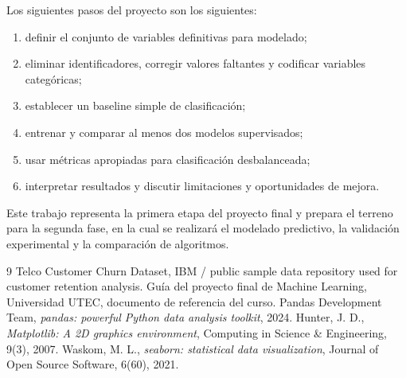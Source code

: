\documentclass[conference]{IEEEtran}
\begin{document}
Los siguientes pasos del proyecto son los siguientes:
\begin{enumerate}[leftmargin=*]
 \item definir el conjunto de variables definitivas para modelado;
 \item eliminar identificadores, corregir valores faltantes y codificar variables categóricas;
 \item establecer un baseline simple de clasificación;
 \item entrenar y comparar al menos dos modelos supervisados;
 \item usar métricas apropiadas para clasificación desbalanceada;
 \item interpretar resultados y discutir limitaciones y oportunidades de mejora.
\end{enumerate}

Este trabajo representa la primera etapa del proyecto final y prepara el terreno para la segunda fase, en la cual se realizará el modelado predictivo, la validación experimental y la comparación de algoritmos.

\begin{thebibliography}{9}
 Telco Customer Churn Dataset, IBM / public sample data repository used for customer retention analysis.
 Guía del proyecto final de Machine Learning, Universidad UTEC, documento de referencia del curso.
 Pandas Development Team, \emph{pandas: powerful Python data analysis toolkit}, 2024.
 Hunter, J. D., \emph{Matplotlib: A 2D graphics environment}, Computing in Science \& Engineering, 9(3), 2007.
 Waskom, M. L., \emph{seaborn: statistical data visualization}, Journal of Open Source Software, 6(60), 2021.
\end{thebibliography}
\end{document}
